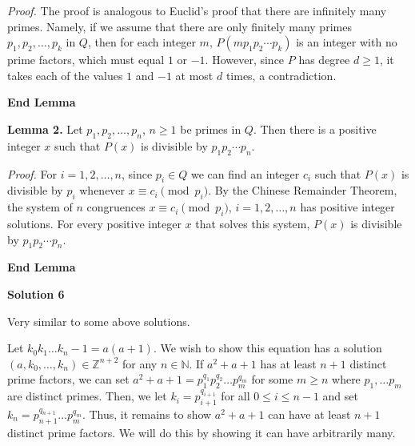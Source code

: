 \begin{enumerate}
 \textit{Proof.} The proof is analogous to Euclid's proof that there are infinitely many primes. Namely, if we assume that there are only finitely many primes $p_1, p_2, \ldots, p_k$ in $Q$, then for each integer $m$, $P(mp_1p_2\cdots p_k)$ is an integer with no prime factors, which must equal $1$ or $-1$. However, since $P$ has degree $d\geq 1$, it takes each of the values $1$ and $-1$ at most $d$ times, a contradiction.

 \textbf{End Lemma}

 \textbf{Lemma 2.} Let $p_1, p_2, \ldots, p_n$, $n\geq 1$ be primes in $Q$. Then there is a positive integer $x$ such that $P(x)$ is divisible by $p_1p_2\cdots p_n$.

 \textit{Proof.} For $i = 1, 2, \ldots, n$, since $p_i\in Q$ we can find an integer $c_i$ such that $P(x)$ is divisible by $p_i$ whenever $x\equiv c_i\pmod{p_i}$. By the Chinese Remainder Theorem, the system of $n$ congruences $x\equiv c_i\pmod{p_i}$, $i = 1, 2, \ldots, n$ has positive integer solutions. For every positive integer $x$ that solves this system, $P(x)$ is divisible by $p_1p_2\cdots p_n$.

 \textbf{End Lemma}

 



\textbf{Solution 6}

Very similar to some above solutions.

 Let $k_{0}k_{1}\dots k_{n}-1=a(a+1)$. We wish to show this equation has a solution $(a,k_{0},\dots,k_{n})\in\mathbb{Z}^{n+2}$ for any $n\in\mathbb{N}$. If $a^{2}+a+1$ has at least $n+1$ distinct prime factors, we can set $a^{2}+a+1=p_{1}^{q_{1}}p_{2}^{q_{2}}\dots p_{m}^{q_{m}}$ for some $m\geq n$ where $p_{1},\dots p_{m}$ are distinct primes. Then, we let $k_{i}=p_{i+1}^{q_{i+1}}$ for all $0\leq i\leq n-1$ and set $k_{n}=p_{n+1}^{q_{n+1}}\dots p_{m}^{q_{m}}$. Thus, it remains to show $a^{2}+a+1$ can have at least $n+1$ distinct prime factors. We will do this by showing it can have arbitrarily many.


\end{enumerate}
